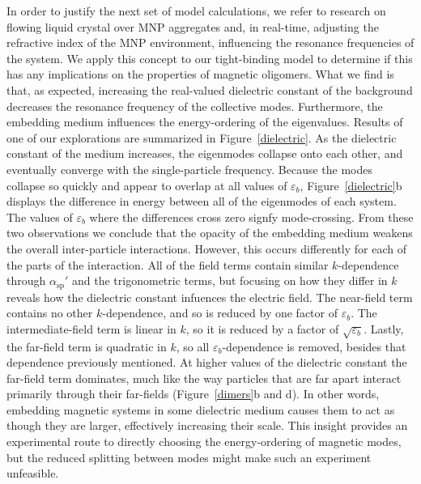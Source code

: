 \documentclass[journal=ancac3,manuscript=article]{achemso}
\begin{document}
In order to justify the next set of model calculations, we refer to research on flowing liquid crystal over MNP aggregates and, in real-time, adjusting the refractive index of the MNP environment, influencing the resonance frequencies of the system\cite{odom_lasing}. We apply this concept to our tight-binding model to determine if this has any implications on the properties of magnetic oligomers. What we find is that, as expected, increasing the real-valued dielectric constant of the background decreases the resonance frequency of the collective modes. Furthermore, the embedding medium influences the energy-ordering of the eigenvalues. Results of one of our explorations are summarized in Figure~\ref{dielectric}. As the dielectric constant of the medium increases, the eigenmodes collapse onto each other, and eventually converge with the single-particle frequency. Because the modes collapse so quickly and appear to overlap at all values of $\varepsilon_b$, Figure~\ref{dielectric}b displays the difference in energy between all of the eigenmodes of each system. The values of $\varepsilon_b$ where the differences cross zero signfy mode-crossing. 
From these two observations we conclude that the opacity of the embedding medium weakens the overall inter-particle interactions. However, this occurs differently for each of the parts of the interaction. All of the field terms contain similar $k$-dependence through $\alpha_{\textrm{sp}}'$ and the trigonometric terms, but focusing on how they differ in $k$ reveals how the dielectric constant infuences the electric field. The near-field term contains no other $k$-dependence, and so is reduced by one factor of $\varepsilon_b$. The intermediate-field term is linear in $k$, so it is reduced by a factor of $\sqrt{\varepsilon_b}$. Lastly, the far-field term is quadratic in $k$, so all $\varepsilon_b$-dependence is removed, besides that dependence previously mentioned. At higher values of the dielectric constant the far-field term dominates, much like the way particles that are far apart interact primarily through their far-fields (Figure~\ref{dimers}b and d). In other words, embedding magnetic systems in some dielectric medium causes them to act as though they are larger, effectively increasing their scale. This insight provides an experimental route to directly choosing the energy-ordering of magnetic modes, but the reduced splitting between modes might make such an experiment unfeasible.
\end{document}
